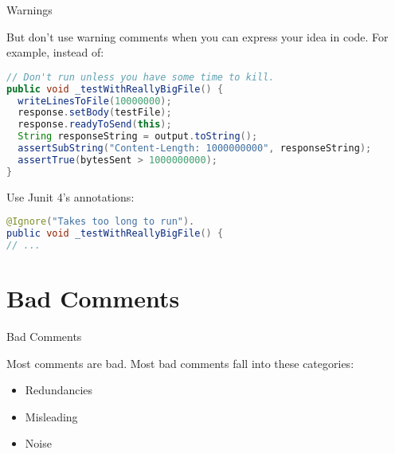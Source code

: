 \documentclass{beamer}
\begin{document}
\begin{frame}[fragile]{Warnings}


But don't use warning comments when you can express your idea in code.  For example, instead of:
\begin{lstlisting}[language=Java]
// Don't run unless you have some time to kill.
public void _testWithReallyBigFile() {
  writeLinesToFile(10000000);
  response.setBody(testFile);
  response.readyToSend(this);
  String responseString = output.toString();
  assertSubString("Content-Length: 1000000000", responseString); 
  assertTrue(bytesSent > 1000000000);
}
\end{lstlisting}
Use Junit 4's annotations: 
\begin{lstlisting}[language=Java]
@Ignore("Takes too long to run").
public void _testWithReallyBigFile() {
// ...
\end{lstlisting}

\end{frame}

\section{Bad Comments}

\begin{frame}[fragile]{Bad Comments}


Most comments are bad.  Most bad comments fall into these categories:

\begin{itemize}
\item Redundancies
\item Misleading
\item Noise
\end{itemize}


\end{frame}
\end{document}
